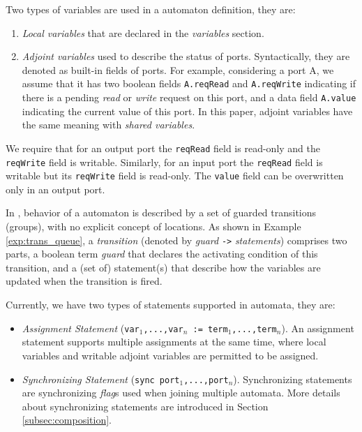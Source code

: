  Two types of variables are used in a automaton definition, they are:
\begin{enumerate}
    \item \emph{Local variables} that are declared in the \emph{variables} section. 
    \item \emph{Adjoint variables} used to describe the status of ports. Syntactically, they are denoted as built-in fields of ports. For example, considering a port A, we assume that it has two boolean fields \texttt{A.reqRead} and \texttt{A.reqWrite} indicating if there is a pending \emph{read} or \emph{write} request on this port, and a data field \texttt{A.value} indicating the current value of this port. In this paper, adjoint variables have the same meaning with \emph{shared variables}.
\end{enumerate}

We require that for an output port the \texttt{reqRead} field is read-only and the \texttt{reqWrite} field is writable. Similarly, for an input port the \texttt{reqRead} field is writable but its \texttt{reqWrite} field is read-only. The \texttt{value} field can be overwritten only in an output port.

In \lang{}, behavior of a automaton is described by a set of guarded transitions (groups), with no explicit concept of locations. As shown in  Example \ref{exp:trans_queue}, a \emph{transition} (denoted by \emph{guard} \texttt{->} \emph{statements}) comprises two parts, a boolean term \emph{guard} that declares the activating condition of this transition, and a (set of) statement(s) that describe how the variables are updated when the transition is fired.

Currently, we have two types of statements supported in automata, they are:
\begin{itemize}
    \item \emph{Assignment Statement} (\texttt{var$_1$,...,var$_n$ := term$_1$,...,term$_n$}). An assignment statement supports multiple assignments at the same time, where local variables and writable adjoint variables are permitted to be assigned.
    \item \emph{Synchronizing Statement} (\texttt{sync port$_1$,...,port$_n$}). Synchronizing statements are synchronizing \emph{flag}s used when joining multiple automata. More details about synchronizing statements are introduced in Section \ref{subsec:composition}.
\end{itemize}

